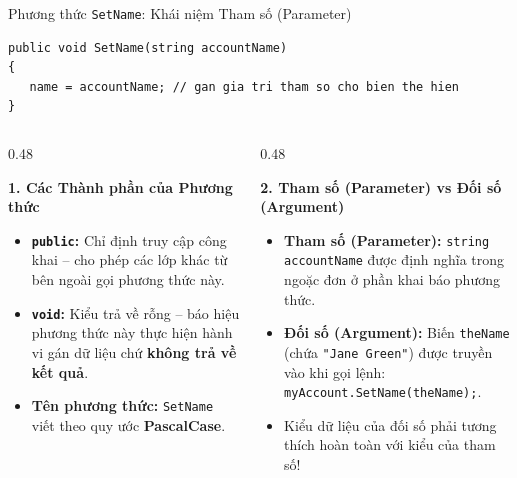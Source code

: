 \documentclass[aspectratio=169, 10pt]{beamer}
\begin{document}
\begin{frame}[fragile]{Phương thức \texttt{SetName}: Khái niệm Tham số (Parameter)}
  \begin{tcolorbox}[colback=CodeBg,colframe=UniNavy,title=\textbf{Giải phẫu Khai báo Phương thức SetName},fonttitle=\small\bfseries]
\begin{lstlisting}
public void SetName(string accountName)
{
   name = accountName; // gan gia tri tham so cho bien the hien
}
\end{lstlisting}
  \end{tcolorbox}
  \begin{columns}[T]
    \begin{column}{0.48\textwidth}
      \begin{block}{\textbf{1. Các Thành phần của Phương thức}}
        \begin{itemize}\small
          \item \textbf{\texttt{public}:} Chỉ định truy cập công khai -- cho phép các lớp khác từ bên ngoài gọi phương thức này.
          \item \textbf{\texttt{void}:} Kiểu trả về rỗng -- báo hiệu phương thức này thực hiện hành vi gán dữ liệu chứ \textbf{không trả về kết quả}.
          \item \textbf{Tên phương thức:} \texttt{SetName} viết theo quy ước \textbf{PascalCase}.
        \end{itemize}
      \end{block}
    \end{column}

    \begin{column}{0.48\textwidth}
      \begin{exampleblock}{\textbf{2. Tham số (Parameter) vs Đối số (Argument)}}
        \begin{itemize}\small
          \item \textbf{Tham số (Parameter):} \texttt{string accountName} được định nghĩa trong ngoặc đơn ở phần khai báo phương thức.
          \item \textbf{Đối số (Argument):} Biến \texttt{theName} (chứa \texttt{"Jane Green"}) được truyền vào khi gọi lệnh: \texttt{myAccount.SetName(theName);}.
          \item Kiểu dữ liệu của đối số phải tương thích hoàn toàn với kiểu của tham số!
        \end{itemize}
      \end{exampleblock}
    \end{column}
  \end{columns}
\end{frame}
\end{document}
